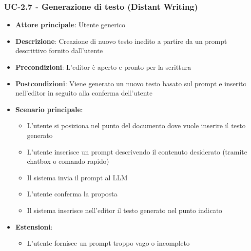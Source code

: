 \documentclass[11pt,a4paper]{article}
\begin{document}
\subsubsection{UC-2.7 - Generazione di testo (Distant Writing)}
\begin{itemize}
    \item \textbf{Attore principale}: Utente generico
    \item \textbf{Descrizione}: Creazione di nuovo testo inedito a partire da un prompt descrittivo fornito dall’utente
    \item \textbf{Precondizioni}: L’editor è aperto e pronto per la scrittura
    \item \textbf{Postcondizioni}: Viene generato un nuovo testo basato sul prompt e inserito nell’editor in seguito alla conferma dell'utente
    \item \textbf{Scenario principale}:
    \begin{itemize}
        \item L’utente si posiziona nel punto del documento dove vuole inserire il testo generato
        \item L’utente inserisce un prompt descrivendo il contenuto desiderato (tramite chatbox o comando rapido)
        \item Il sistema invia il prompt al LLM
        \item L'utente conferma la proposta
        \item Il sistema inserisce nell'editor il testo generato nel punto indicato
    \end{itemize}
    \item \textbf{Estensioni}:
    \begin{itemize}
        \item L’utente fornisce un prompt troppo vago o incompleto
    \end{itemize}
\end{itemize}
\end{document}
